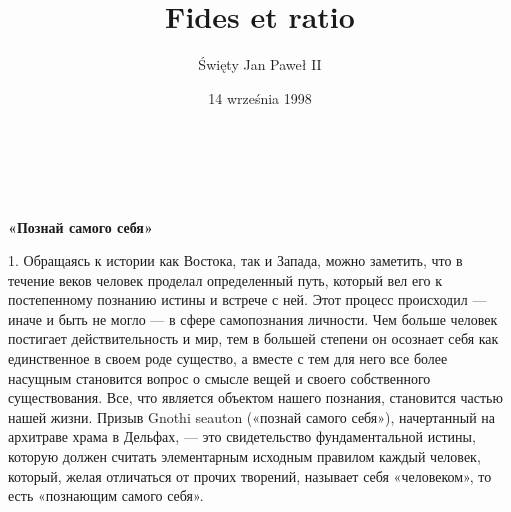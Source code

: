 \documentclass[a5paper,10pt]{article}
\title{\huge{Fides et ratio}}
\author{Święty Jan Paweł II}
\date{14 września 1998}
\newcommand\blankpage{%
    \null
    \thispagestyle{empty}%
    \addtocounter{page}{-1}%
    \newpage}
\begin{document}


\makeatletter
    \begin{titlepage}
        \begin{center}
            \vspace*{0.5cm} %
            {\huge \scshape  \bfseries  \@title }\\[2ex] 
            {\large  \@author}\\[4ex]
            \vspace*{1.5cm}
            \vfill
            {\normalsize \@date}
        \end{center}
    \end{titlepage}
\makeatother


\newpage

\pagestyle{empty}

 \vspace*{\fill}


    
    
	


\newpage


\setcounter{page}{1} %
\pagestyle{fancy}

\textbf{«Познай самого себя»}

1. Обращаясь к истории как Востока, так и Запада, можно заметить, что в течение
веков человек проделал определенный путь, который вел его к постепенному
познанию истины и встрече с ней. Этот процесс происходил — иначе и быть не
могло — в сфере самопознания личности. Чем больше человек постигает
действительность и мир, тем в большей степени он осознает себя как единственное
в своем роде существо, а вместе с тем для него все более насущным становится
вопрос о смысле вещей и своего собственного существования. Все, что является
объектом нашего познания, становится частью нашей жизни. Призыв Gnothi seauton
(«познай самого себя»), начертанный на архитраве храма в Дельфах, — это
свидетельство фундаментальной истины, которую должен считать элементарным
исходным правилом каждый человек, который, желая отличаться от прочих творений,
называет себя «человеком», то есть «познающим самого себя».
\end{document}

